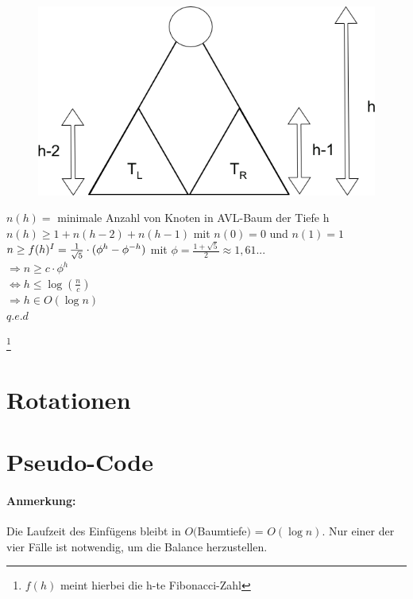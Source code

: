 \begin{minipage}[t]{0.4\textwidth}
\begin{figure}[H]
\includegraphics[width=\textwidth,left]{11/Grafik/img2.png}\\
\end{figure}%

\end{minipage}
\hspace{5mm}
\begin{minipage}[t]{0.55\textwidth}
$n(h) =$ minimale Anzahl von Knoten in AVL-Baum der Tiefe h\\

$n(h) \geq 1+n(h-2) + n(h-1)$ mit  $n(0)=0$ und $n(1)=1$\\

$n \geq f(h)^{\RM{1}} = \frac{1}{\sqrt{5}} \cdot (\phi^h-\phi^{-h})$ mit $\phi = \frac{1+\sqrt{5}}{2} \approx 1,61...$\\
$\Rightarrow n \geq c \cdot \phi^h$\\
$\Leftrightarrow h \leq \log{(\frac{n}{c})}$\\

$\Rightarrow h \in O(\log{n})$\\

$q.e.d$
\end{minipage}


\footnote[1]{$f(h)$ meint hierbei die h-te Fibonacci-Zahl} 

\pagebreak



\section{Rotationen}

\pagebreak


\section{Pseudo-Code}


\paragraph{Anmerkung:} Die Laufzeit des Einfügens bleibt in $O($Baumtiefe$)$ = $O(\log{n})$. Nur einer der vier Fälle ist notwendig, um die Balance herzustellen. 
\pagebreak